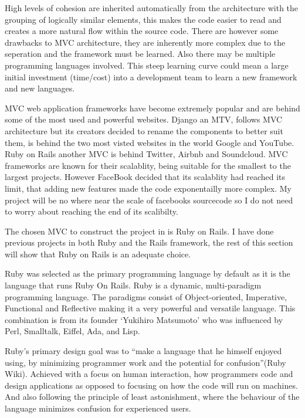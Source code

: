 \documentclass[a4paper,12pt]{article}
\begin{document}
\vspace{5mm}
\par High levels of cohesion are inherited automatically from the architecture with the grouping of logically similar elements, this makes the code easier to read and creates a more natural flow within the source code. There are however some drawbacks to MVC architecture, they are inherently more complex due to the seperation and the framework must be learned. Also there may be multiple programming languages involved. This steep learning curve could mean a large initial investment (time/cost) into a development team to learn a new framework and new languages.
\vspace{5mm}
\par MVC web application frameworks have become extremely popular and are behind some of the most used and powerful websites. Django an MTV, follows MVC architecture but its creators decided to rename the components \cite{Django} to better suit them, is behind the two most visted websites in the world Google and YouTube\cite{SHUUP}\cite{Alexa}. Ruby on Rails another MVC is behind Twitter, Airbnb and Soundcloud.\cite{Coderfactory} MVC frameworks are known for their scalablity, being suitable for the smallest to the largest projects. However FaceBook decided that its scalablity had reached its limit, that adding new features made the code exponentailly more complex.\cite{Infoq} My project will be no where near the scale of facebooks sourcecode so I do not need to worry about reaching the end of its scalibilty.
\vspace{5mm}
\par The chosen MVC to construct the project in is Ruby on Rails. I have done previous projects in both Ruby and the Rails framework, the rest of this section will show that Ruby on Rails is an adequate choice.
\vspace{5mm}
\par Ruby was selected as the primary programming language by default as it is the language that runs Ruby On Rails. Ruby is a dynamic, multi-paradigm programming language. The paradigms consist of Object-oriented, Imperative, Functional and Reflective making it a very powerful and versatile language. This combination is from its founder ‘Yukihiro Matsumoto’ who was influenced by Perl, Smalltalk, Eiffel, Ada, and Lisp.
\vspace{5mm}
\par Ruby’s primary design goal was to “make a language that he himself enjoyed using, by minimizing programmer work and the potential for confusion”(Ruby Wiki). Achieved with a focus on human interaction, how programmers code and design applications as opposed to focusing on how the code will run on machines. And also following the principle of least astonishment, where the behaviour of the language minimizes confusion for experienced users.
\end{document}
